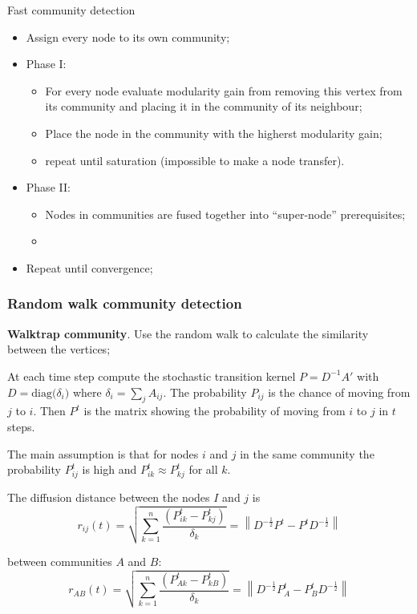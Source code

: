 \documentclass[a4paper]{article}
\newcommand{\nrm}[1]{{\left\| #1 \right \|}}
\begin{document}
Fast community detection
\begin{itemize}
	\item Assign every node to its own community;
	\item Phase I: \begin{itemize}
		\item For every node evaluate modularity gain from removing this vertex from its community and placing it in the community of its neighbour;
		\item Place the node in the community with the higherst modularity gain;
		\item repeat until saturation (impossible to make a node transfer). 
	\end{itemize}
	\item Phase II: \begin{itemize}
		\item Nodes in communities are fused together into ``super-node'' prerequisites;
		\item
	\end{itemize}
	\item Repeat until convergence;
\end{itemize}


\subsubsection{Random walk community detection} %
\label{ssub:random_walk_community_detection}

\noindent\textbf{Walktrap community}. Use the random walk to calculate the similarity between the vertices;

At each time step compute the stochastic transition kernel $P = D^{-1}A'$ with $D=\text{diag}\big(\delta_i\big)$ where $\delta_i = \sum_j A_{ij}$. The probability $P_{ij}$ is the chance of moving from $j$ to $i$. Then $P^t$ is the matrix showing the probability of moving from $i$ to $j$ in $t$ steps.

The main assumption is that for nodes $i$ and $j$ in the same community the probability $P_{ij}^t$ is high and $P_{ik}^t \approx P_{kj}^t$ for all $k$.  

The diffusion distance between the nodes $I$ and $j$ is 
\[ r_{ij}(t) = \sqrt{\sum_{k=1}^n\frac{(P_{ik}^t - P_{kj}^t)}{\delta_k} } = \nrm{ D^{-\frac{1}{2}}P^t - P^tD^{-\frac{1}{2}} }\]

between communities $A$ and $B$:
\[ r_{AB}(t) = \sqrt{\sum_{k=1}^n\frac{(P_{Ak}^t - P_{kB}^t)}{\delta_k} } = \nrm{ D^{-\frac{1}{2}} P_A^t  - P_B^t D^{-\frac{1}{2}} }\]
\end{document}
